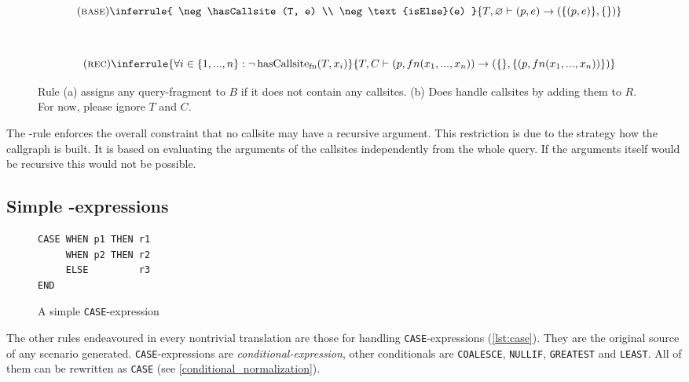 \begin{figure}[h]\small
    \begin{minipage}[b]{\linewidth}
    \centering %
    
  $$
\quad(\textsc{base})\inferrule{
   \neg \hasCallsite(T, e) \\
   \neg \text{isElse}(e)
}{
    T, \varnothing \vdash (p, e) \rightarrow (\{(p, e)\},\{\})
}$$
    \subcaption{}\label{rule:base}
    \end{minipage}\\
    \begin{minipage}[b]{\linewidth}
    \centering %
$$\quad(\textsc{rec})\inferrule{
   \forall i \in \{1, ..., n\} : \neg \hasCallsite(T, x_i)
}{
    T, C \vdash (p, fn(x_1, ..., x_n)) \rightarrow (\{\}, \{(p, fn(x_1, ..., x_n))\})
}
$$
    \subcaption{}\label{rule:rec}
    \end{minipage}
    \caption{Rule (a) assigns any query-fragment to $B$ if it does not contain any callsites. (b) Does handle callsites by adding them to $R$. For now, please ignore $T$ and $C$.}\label{rule:base_and_rec}
\end{figure}

The \RREC-rule enforces the overall constraint that no callsite may have a recursive argument. This restriction is due to the strategy how the callgraph is built. It is based on evaluating the arguments of the callsites independently from the whole query. If the arguments itself would be recursive this would not be possible.

\subsection{Simple \CASE-expressions}
\begin{wrapfigure}{r}{.3\textwidth}\centering
\begin{verbatim}
CASE WHEN p1 THEN r1
     WHEN p2 THEN r2
     ELSE         r3
END
\end{verbatim}
\caption{A simple \texttt{CASE}-expression}\vspace{-5mm} 
\label{lst:case}
\end{wrapfigure}

The other rules endeavoured in every nontrivial translation are those for handling \texttt{CASE}-expressions (\autoref{lst:case}). They are the original source of any scenario generated. \texttt{CASE}-expressions are \textit{conditional-expression}, other conditionals are \texttt{COALESCE}, \texttt{NULLIF}, \texttt{GREATEST} and \texttt{LEAST}. All of them can be rewritten as \texttt{CASE} (see \autoref{conditional_normalization}).

